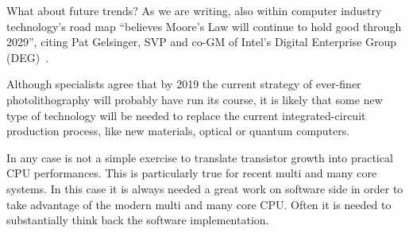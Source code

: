 
What about future trends? As we are writing, also within computer 
industry technology's road map ``believes Moore's Law will continue to hold good through 2029'',  citing Pat Gelsinger, SVP and co-GM of Intel's Digital Enterprise Group (DEG)~\cite{IntelCite}.

Although specialists agree that by 2019 the current strategy of ever-finer photolithography will 
probably have run its course, it is likely that some new type of technology will be needed to replace the current
integrated-circuit production process, like new materials, optical or quantum computers.


In any case is not a simple exercise to translate transistor growth into practical CPU performances. This is
particularly true for recent multi and many core systems. In this case it is always needed a great 
work on software side in order to take advantage of the modern multi and many core CPU. 
Often it is needed to substantially think back the software implementation.

